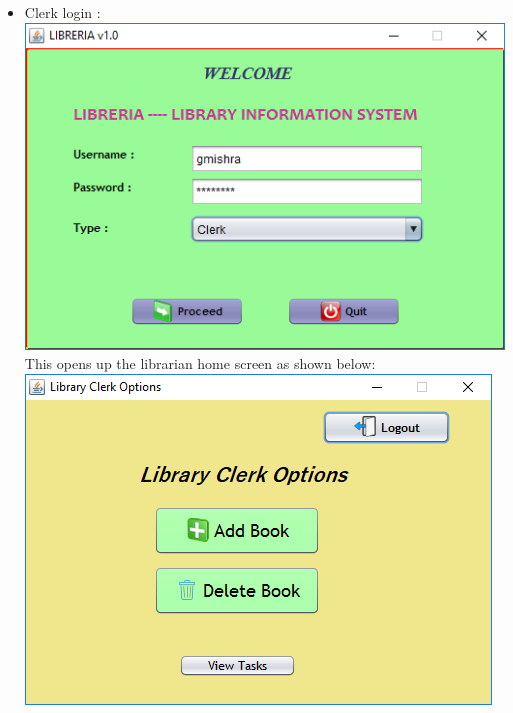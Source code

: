 \documentclass{article}
\begin{document}
\begin{enumerate}
\begin{itemize}
\item Clerk login :\\
\includegraphics[scale=0.8]{images/ClerkLogin/LoginScreen.PNG}
\\This opens up the librarian home screen as shown below:\\
\includegraphics[scale=0.8]{images/ClerkLogin/ClerkActions.PNG}


\end{itemize}
\end{enumerate}
\end{document}
